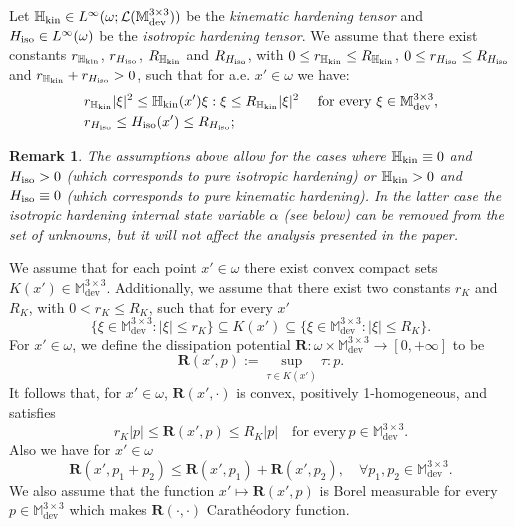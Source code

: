 \documentclass[reqno,10pt]{amsart}
\numberwithin{equation}{section}
\newtheorem{remark}[theorem]{Remark}
\theoremstyle{remark}
\newcommand{\BLACK}{\color{black}}
\newcommand{\PINK}{\color{black}}
\newcommand{\M}{\mathbb{M}}
\DeclareMathOperator{\dev}{dev}
\newcommand{\Hkin}{\mathbb{H}_{\rm kin}}
\newcommand{\Hiso}{H_{\rm iso}}
\newcommand{\disspot}{\mathbf{R}}
\begin{document}
Let $\Hkin \in L^\infty(\omega; \mathcal{L}(\M^{3 \times 3}_{\dev}))$ be the {\em kinematic hardening tensor} and $\Hiso \in L^\infty(\omega)$ be the {\em isotropic hardening tensor}.
We assume that there exist constants $r_{\Hkin}$, $r_{\Hiso}$, $R_{\Hkin}$ and $R_{\Hiso}$, with $0 \leq r_{\Hkin} \leq R_{\Hkin}$, $0 \leq r_{\Hiso} \leq R_{\Hiso}$ and $r_{\Hkin} + r_{\Hiso} > 0$, such that for a.e. $x' \in \omega$ we have:
\begin{align*}
	& r_{\Hkin} |\xi|^2 \leq \Hkin(x') \xi : \xi \leq R_{\Hkin} |\xi|^2 \quad \text{ for every }\xi \in \M^{3 \times 3}_{\dev},\\
	& r_{\Hiso} \leq \Hiso(x') \leq R_{\Hiso};
\end{align*}
\begin{remark}
The assumptions above allow for the cases where $\Hkin \equiv 0$ and $\Hiso > 0$ (which corresponds to pure isotropic hardening) or $\Hkin > 0$ and $\Hiso \equiv 0$ (which corresponds to pure kinematic hardening).
In the latter case the isotropic hardening internal state variable $\alpha$ (see below) can be removed from the set of unknowns, but it will not affect the analysis presented in the paper.
\end{remark}

\medskip
{} \nopagebreak

We assume that for each point $x' \in \omega$ there exist convex compact sets $K(x') \in \M^{3 \times 3}_{\dev}$.
Additionally, we assume that there exist two constants $r_K$ and $R_K$, with $0 < r_K \leq R_K$, such that for every $x'$
\begin{equation*}
	\{ \xi \in \M^{3 \times 3}_{\dev} : |\xi| \leq r_K \} \subseteq K(x') \subseteq\{ \xi \in \M^{3 \times 3}_{\dev}: |\xi| \leq R_K \}.
\end{equation*}
For $x' \in \omega$, we define the dissipation potential $\disspot : \omega \times \M^{3 \times 3}_{\dev} \to [0,+\infty]$ to be 
\begin{equation*}
	\disspot(x', p) := \sup\limits_{\tau \in K(x')} \tau : p.
\end{equation*}
It follows that, for $x' \in \omega$, $\disspot(x',\cdot)$ is convex, positively 1-homogeneous, and satisfies
\begin{equation} \label{coercivity of R}
	r_K |p| \leq \disspot(x', p) \leq R_K |p| \quad \text{for every}\, p \in \M^{3 \times 3}_{\dev}.
\end{equation}
Also we have for $x' \in \omega $ 
\begin{equation} \label{distriangle} 
	\disspot(x', p_1+p_2)\leq \disspot(x', p_1)+ \disspot(x', p_2),\quad \forall p_1,p_2 \in \M^{3 \times 3}_{\dev}.
\end{equation} 
We also {\PINK assume\BLACK} that the function $x'\mapsto \disspot (x',p)$ is Borel measurable for every $p \in \M^{3 \times 3}_{\dev}$ which makes $\disspot(\cdot,\cdot)$ Carath\'{e}odory function.
\end{document}
